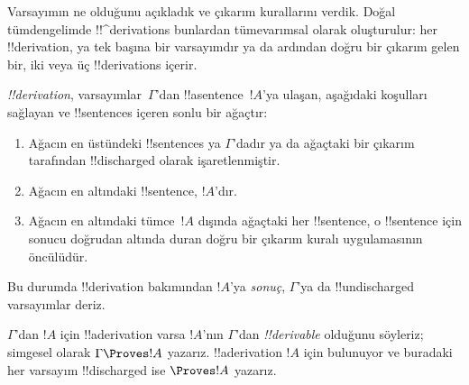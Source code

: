 

      {}
      {}


\begin{explain}
Varsayımın ne olduğunu açıkladık ve çıkarım kurallarını verdik. Doğal
tümdengelimde !!^{derivation}s bunlardan tümevarımsal olarak oluşturulur: her
!!{derivation}, ya tek başına bir varsayımdır ya da ardından doğru bir
çıkarım gelen bir, iki veya üç !!{derivation}s içerir.
\end{explain}

\begin{defn}[!!^{derivation}]
 \emph{!!{derivation}}, varsayımlar~$\Gamma$'dan
!!a{sentence}~$!A$'ya ulaşan, aşağıdaki koşulları sağlayan ve !!{sentence}s
içeren sonlu bir ağaçtır:
\begin{enumerate}
\item Ağacın en üstündeki !!{sentence}s ya $\Gamma$'dadır ya da ağaçtaki bir
  çıkarım tarafından !!{discharged} olarak işaretlenmiştir.
\item Ağacın en altındaki !!{sentence}, $!A$'dır.
\item Ağacın en altındaki tümce~$!A$ dışında ağaçtaki her !!{sentence},
  o !!{sentence} için sonucu doğrudan altında duran doğru bir çıkarım kuralı
  uygulamasının öncülüdür.
\end{enumerate}
Bu durumda !!{derivation} bakımından $!A$'ya \emph{sonuç}, $\Gamma$'ya da
!!{undischarged} varsayımlar deriz.

$\Gamma$'dan $!A$ için !!a{derivation} varsa $!A$'nın $\Gamma$'dan
\emph{!!{derivable}} olduğunu söyleriz; simgesel olarak $\Gamma \Proves
!A$ yazarız. !!a{derivation} $!A$ için bulunuyor ve buradaki her varsayım
!!{discharged} ise $\Proves !A$ yazarız.
\end{defn}

